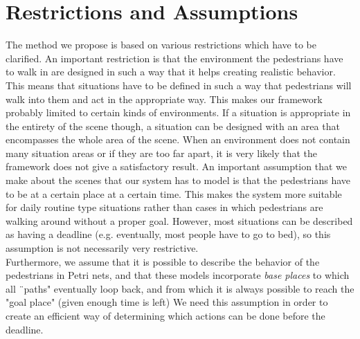 \documentclass[11pt]{book}
\begin{document}
\section{Restrictions and Assumptions}
\label{sec:restrictions}
The method we propose is based on various restrictions which have to be clarified. An important restriction is that the environment the pedestrians have to walk in are designed in such a way that it helps creating realistic behavior. This means that situations have to be defined in such a way that pedestrians will walk into them and act in the appropriate way. This makes our framework probably limited to certain kinds of environments. If a situation is appropriate in the entirety of the scene though, a situation can be designed with an area that encompasses the whole area of the scene. When an environment does not contain many situation areas or if they are too far apart, it is very likely that the framework does not give a satisfactory result.
An important assumption that we make about the scenes that our system has to model is that the pedestrians have to be at a certain place at a certain time. This makes the system more suitable for daily routine type situations rather than cases in which pedestrians are walking around without a proper goal. However, most situations can be described as having a deadline (e.g. eventually, most people have to go to bed), so this assumption is not necessarily very restrictive.\\
Furthermore, we assume that it is possible to describe the behavior of the pedestrians in Petri nets, and that these models incorporate \emph{base places} to which all ¨paths" eventually loop back, and from which it is always possible to reach the "goal place" (given enough time is left) We need this assumption in order to create an efficient way of determining which actions can be done before the deadline. \\
\end{document}
